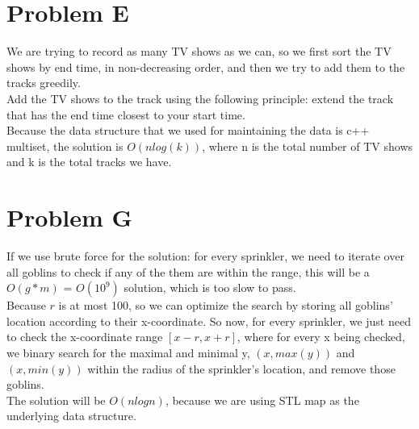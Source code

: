 \documentclass[10pt]{article}
\begin{document}
\newpage



\section*{Problem E}

We are trying to record as many TV shows as we can, so we first sort the TV shows by end time, in non-decreasing order, and then we try to add them to the tracks greedily.\\

Add the TV shows to the track using the following principle: extend the track that has the end time closest to your start time. \\

Because the data structure that we used for maintaining the data is c++ multiset, the solution is $O(nlog(k))$, where n is the total number of TV shows and k is the total tracks we have. \\



\newpage



\section*{Problem G}

If we use brute force for the solution: for every sprinkler, we need to iterate over all goblins to check if any of the them are within the range, this will be a $O(g * m)$ = $O(10^9)$ solution, which is too slow to pass. \\

Because $r$ is at most 100, so we can optimize the search by storing all goblins' location according to their x-coordinate. So now, for every sprinkler, we just need to check the x-coordinate range $[x - r, x + r]$, where for every x being checked, we binary search for the maximal and minimal y, $(x, max(y))$ and $(x, min(y))$ within the radius of the sprinkler's location, and remove those goblins.\\

The solution will be $O(nlogn)$, because we are using STL map as the underlying data structure. \\



\newpage
\end{document}
